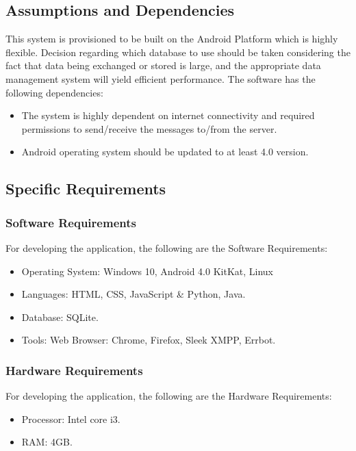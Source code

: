 \subsection{Assumptions and Dependencies}
This system is provisioned to be built on the Android Platform which is highly flexible. Decision regarding
which database to use should be taken considering the fact that data being exchanged or stored is large, and
the appropriate data management system will yield efficient performance.
The software has the following dependencies:
\begin{itemize}
\item The system is highly dependent on internet connectivity and required permissions to send/receive
the messages to/from the server.
\item Android operating system should be updated to at least 4.0 version.
\end{itemize}
\subsection{Specific Requirements}
\subsubsection{Software Requirements}
For developing the application, the following are the Software Requirements:
\begin{itemize}
\item Operating System: Windows 10, Android 4.0 KitKat, Linux
\item Languages: HTML, CSS, JavaScript \& Python, Java.
\item Database: SQLite.
\item Tools: Web Browser: Chrome, Firefox, Sleek XMPP, Errbot.
\end{itemize}
\subsubsection{Hardware Requirements}
For developing the application, the following are the Hardware Requirements:
\begin{itemize}
\item Processor: Intel core i3.
\item RAM: 4GB.
\end{itemize}

